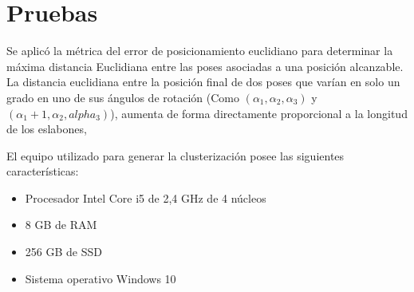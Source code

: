 \section{Pruebas}

Se aplicó la métrica del error de posicionamiento euclidiano para determinar la máxima distancia Euclidiana entre las poses asociadas a una posición alcanzable. La distancia euclidiana entre la posición final de dos poses que varían en solo un grado en uno de sus ángulos de rotación (Como $(\alpha_1,\alpha_2,\alpha_3)$ y $(\alpha_1 + 1, \alpha_2, alpha_3)$), aumenta de forma directamente proporcional a la longitud de los eslabones, 

El equipo utilizado para generar la clusterización posee las siguientes características:

\begin{itemize}
	\item Procesador Intel Core i5 de 2,4 GHz de 4 núcleos
	\item 8 GB de RAM
	\item 256 GB de SSD
	\item Sistema operativo Windows 10
\end{itemize}

